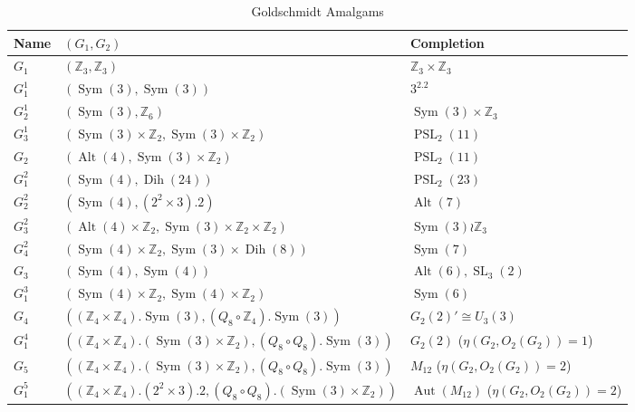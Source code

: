 \documentclass[12pt,a4paper,openany]{book}
\begin{document}
\begin{table}[h]
\centering
\caption{Goldschmidt Amalgams}
\label{tab:goldschmidt}
\begin{tabular}{lll}
\toprule
\textbf{Name} & \textbf{$(G_1, G_2)$} & \textbf{Completion} \\
\midrule
$G_1$ & $(\mathbb{Z}_3, \mathbb{Z}_3)$ & $\mathbb{Z}_3 \times \mathbb{Z}_3$ \\
$G_1^1$ & $(\operatorname{Sym}(3), \operatorname{Sym}(3))$ & $3^2.2$ \\
$G_2^1$ & $(\operatorname{Sym}(3), \mathbb{Z}_6)$ & $\operatorname{Sym}(3) \times \mathbb{Z}_3$ \\
$G_3^1$ & $(\operatorname{Sym}(3) \times \mathbb{Z}_2, \operatorname{Sym}(3) \times \mathbb{Z}_2)$ & $\operatorname{PSL}_2(11)$ \\
$G_2$ & $(\operatorname{Alt}(4), \operatorname{Sym}(3) \times \mathbb{Z}_2)$ & $\operatorname{PSL}_2(11)$ \\
$G_1^2$ & $(\operatorname{Sym}(4), \operatorname{Dih}(24))$ & $\operatorname{PSL}_2(23)$ \\
$G_2^2$ & $(\operatorname{Sym}(4), (2^2 \times 3).2)$ & $\operatorname{Alt}(7)$ \\
$G_3^2$ & $(\operatorname{Alt}(4) \times \mathbb{Z}_2, \operatorname{Sym}(3) \times \mathbb{Z}_2 \times \mathbb{Z}_2)$ & $\operatorname{Sym}(3) \wr \mathbb{Z}_3$ \\
$G_4^2$ & $(\operatorname{Sym}(4) \times \mathbb{Z}_2, \operatorname{Sym}(3) \times \operatorname{Dih}(8))$ & $\operatorname{Sym}(7)$ \\
$G_3$ & $(\operatorname{Sym}(4), \operatorname{Sym}(4))$ & $\operatorname{Alt}(6), \operatorname{SL}_3(2)$ \\
$G_1^3$ & $(\operatorname{Sym}(4) \times \mathbb{Z}_2, \operatorname{Sym}(4) \times \mathbb{Z}_2)$ & $\operatorname{Sym}(6)$ \\
$G_4$ & $((\mathbb{Z}_4 \times \mathbb{Z}_4).\operatorname{Sym}(3), (Q_8 \circ \mathbb{Z}_4).\operatorname{Sym}(3))$ & $G_2(2)' \cong U_3(3)$ \\
$G_1^4$ & $((\mathbb{Z}_4 \times \mathbb{Z}_4).(\operatorname{Sym}(3) \times \mathbb{Z}_2), (Q_8 \circ Q_8).\operatorname{Sym}(3))$ & $G_2(2)$ ($\eta(G_2, O_2(G_2)) = 1$) \\
$G_5$ & $((\mathbb{Z}_4 \times \mathbb{Z}_4).(\operatorname{Sym}(3) \times \mathbb{Z}_2), (Q_8 \circ Q_8).\operatorname{Sym}(3))$ & $M_{12}$ ($\eta(G_2, O_2(G_2)) = 2$) \\
$G_1^5$ & $((\mathbb{Z}_4 \times \mathbb{Z}_4).(2^2 \times 3).2, (Q_8 \circ Q_8).(\operatorname{Sym}(3) \times \mathbb{Z}_2))$ & $\operatorname{Aut}(M_{12})$ ($\eta(G_2, O_2(G_2)) = 2$) \\
\bottomrule
\end{tabular}
\end{table}
\end{document}
